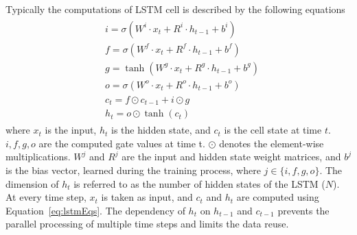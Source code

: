 \documentclass[a4paper,10pt]{article}
\begin{document}
Typically the computations of LSTM cell is described by the following equations
\begin{align}\label{eq:lstmEqs}
	\begin{split}
		&i{=}{\sigma}(W^i{\cdot}x_t{+}R^i{\cdot}h_{t-1}{+}b^i)\\
		&f{=}{\sigma}(W^f{\cdot}x_t{+}R^f{\cdot}h_{t-1}{+}b^f)\\
		&g{=}{\tanh}(W^g{\cdot}x_t{+}R^g{\cdot}h_{t-1}{+}b^g)\\
		&o{=}{\sigma}(W^o{\cdot}x_t{+}R^o{\cdot}h_{t-1}{+}b^o)\\
		&c_{t}{=}f{\odot}c_{t-1}{+}i{\odot}g\\
		&h_{t}{=}o{\odot}{\tanh}(c_t)
	\end{split}	
\end{align}
where $x_t$ is the input, $h_t$ is the hidden state, and $c_t$ is the cell state at time $t$. $i,f,g,o$ are the computed gate values at time t. $\odot$ denotes the element-wise multiplications. $W^j$ and $R^j$ are the input and hidden state weight matrices, and $b^j$ is the bias vector, learned during the training process, where $j\in\{i,f,g,o\}$. The dimension of $h_t$ is referred to as the number of hidden states of the LSTM ($N$). 
At every time step, $x_t$ is taken as input, and $c_t$ and $h_t$ are computed using Equation~\eqref{eq:lstmEqs}. The dependency of $h_t$ on $h_{t-1}$ and $c_{t-1}$ prevents the parallel processing of multiple time steps and limits the data reuse. 
\end{document}
